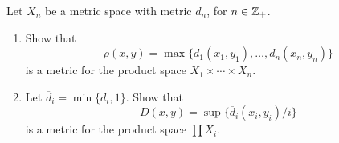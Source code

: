 \begin{exercise}[ID=2.21.3]
  Let $X_n$ be a metric space with metric $d_n$, for $n \in \mathbb{Z}_+$.
  \begin{enumerate}[label={(\alph*)}, align=left, leftmargin=\parindent, listparindent=\parindent, labelwidth=0pt, itemindent=!]
    \item
      Show that
      \begin{equation*}
        \rho(x, y) = \max\{ d_1(x_1, y_1), \ldots, d_n(x_n, y_n) \}
      \end{equation*}
      is a metric for the product space $X_1 \times \cdots \times X_n$.
    \item
      Let $\overline{d}_i = \min\{ d_i, 1 \}$.
      Show that
      \begin{equation*}
        D(x, y) = \sup\{ \overline{d}_i(x_i, y_i) / i \}
      \end{equation*}
      is a metric for the product space $\prod X_i$.
  \end{enumerate}
\end{exercise}
%
